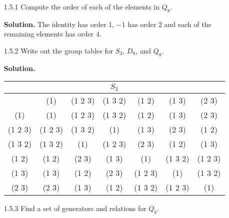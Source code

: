\begin{enumerate}
   \item[1.5.1]   Compute the order of each of the elements in $Q_8$.

      \textbf{Solution.} The identity has order 1, $-1$ has order 2 and each of
      the remaining elements has order 4.      
   \item[1.5.2]   Write out the group tables for $S_3$, $D_8$, and $Q_8$.

      \textbf{Solution.}
      \begin{center}
         \begin{tabular}{@{}|c|c|c|c|c|c|c|@{}} \hline
            \multicolumn{7}{|c|}{$S_3$} \\ \hline
            & (1) & (1 2 3) & (1 3 2) & (1 2) & (1 3) & (2 3) \\ \hline
            (1) & (1) & (1 2 3) & (1 3 2) & (1 2) & (1 3) & (2 3) \\ \hline
            (1 2 3) & (1 2 3) & (1 3 2) & (1) & (1 3) & (2 3) & (1 2) \\ \hline
            (1 3 2) & (1 3 2) & (1) & (1 2 3) & (2 3) & (1 2) & (1 3)  \\ \hline
            (1 2) & (1 2) & (2 3) & (1 3) & (1) & (1 3 2) & (1 2 3) \\ \hline
            (1 3) & (1 3) & (1 2) & (2 3) & (1 2 3) & (1) & (1 3 2) \\ \hline
            (2 3) & (2 3) & (1 3) & (1 2) & (1 3 2) & (1 2 3) & (1) \\ \hline
         \end{tabular}
      \end{center}
   \item[1.5.3]   Find a set of generators and relations for $Q_8$.
\end{enumerate}
